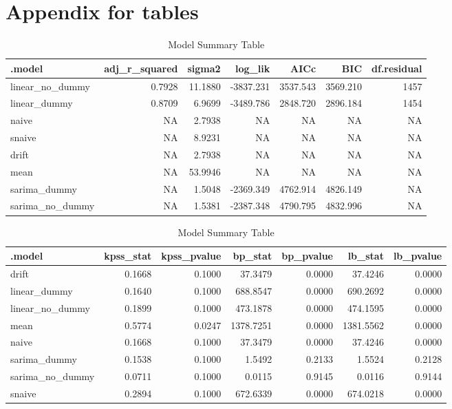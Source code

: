 \clearpage
\section{Appendix for tables}

\begin{table}[!h]
    \centering
    \caption{Model Summary Table}
    \centering
    \begin{tabular}[t]{lrrrrrr}
    \toprule
    .model & adj\_r\_squared & sigma2 & log\_lik & AICc & BIC & df.residual\\
    \midrule
    linear\_no\_dummy & 0.7928 & 11.1880 & -3837.231 & 3537.543 & 3569.210 & 1457\\
    linear\_dummy & 0.8709 & 6.9699 & -3489.786 & 2848.720 & 2896.184 & 1454\\
    naive & NA & 2.7938 & NA & NA & NA & NA\\
    snaive & NA & 8.9231 & NA & NA & NA & NA\\
    drift & NA & 2.7938 & NA & NA & NA & NA\\
    \addlinespace
    mean & NA & 53.9946 & NA & NA & NA & NA\\
    sarima\_dummy & NA & 1.5048 & -2369.349 & 4762.914 & 4826.149 & NA\\
    sarima\_no\_dummy & NA & 1.5381 & -2387.348 & 4790.795 & 4832.996 & NA\\
    \bottomrule
    \end{tabular}
\end{table}

\begin{table}[!h]
    \centering
    \caption{Model Summary Table}
    \centering
    \begin{tabular}[t]{lrrrrrr}
    \toprule
    .model & kpss\_stat & kpss\_pvalue & bp\_stat & bp\_pvalue & lb\_stat & lb\_pvalue\\
    \midrule
    drift & 0.1668 & 0.1000 & 37.3479 & 0.0000 & 37.4246 & 0.0000\\
    linear\_dummy & 0.1640 & 0.1000 & 688.8547 & 0.0000 & 690.2692 & 0.0000\\
    linear\_no\_dummy & 0.1899 & 0.1000 & 473.1878 & 0.0000 & 474.1595 & 0.0000\\
    mean & 0.5774 & 0.0247 & 1378.7251 & 0.0000 & 1381.5562 & 0.0000\\
    naive & 0.1668 & 0.1000 & 37.3479 & 0.0000 & 37.4246 & 0.0000\\
    \addlinespace
    sarima\_dummy & 0.1538 & 0.1000 & 1.5492 & 0.2133 & 1.5524 & 0.2128\\
    sarima\_no\_dummy & 0.0711 & 0.1000 & 0.0115 & 0.9145 & 0.0116 & 0.9144\\
    snaive & 0.2894 & 0.1000 & 672.6339 & 0.0000 & 674.0218 & 0.0000\\
    \bottomrule
    \end{tabular}
\end{table}

